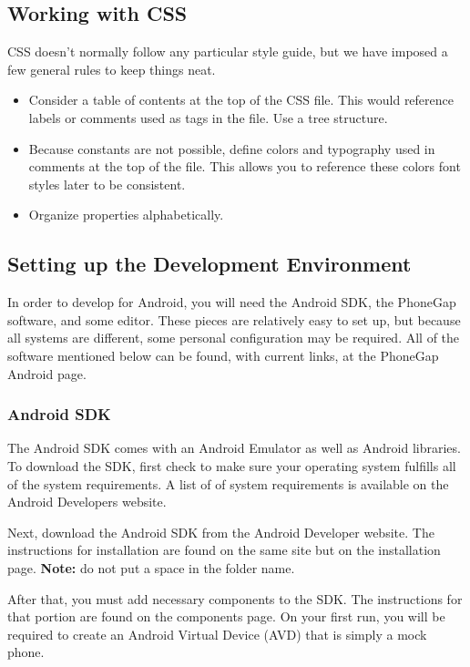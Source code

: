 \documentclass[12pt]{article}
\newenvironment{itemize*}%
  {\begin{itemize}%
  	\setlength{\parsep}{0pt}
    \setlength{\itemsep}{0pt}%
    \setlength{\parskip}{0pt}}%
  {\end{itemize}}
\begin{document}
\begin{itemize*}
\subsection{Working with CSS}
CSS doesn't normally follow any particular style guide, but we have imposed a few general rules to keep things neat\cite{CSSStyle-SmashingMagazine}.

\begin{itemize}
\item Consider a table of contents at the top of the CSS file.  This would reference labels or comments used as tags in the file.  Use a tree structure.
\item Because constants are not possible, define colors and typography used in comments at the top of the file.  This allows you to reference these colors font styles later to be consistent.  
\item Organize properties alphabetically.
\end{itemize}

\subsection{Setting up the Development Environment}
In order to develop for Android, you will need the Android SDK, the PhoneGap software, and some editor.  These pieces are relatively easy to set up, but because all systems are different, some personal configuration may be required.  All of the software mentioned below can be found, with current links, at the PhoneGap Android page\cite{PhoneGap-Android}.  

\subsubsection{Android SDK}
The Android SDK comes with an Android Emulator as well as Android libraries.
To download the SDK, first check to make sure your operating system fulfills all of the system requirements.  A list of of system requirements is available on the Android Developers website\cite{AndroidSDK-SystemRequirements}.

Next, download the Android SDK from the Android Developer website\cite{AndroidSDK-Download}.
The instructions for installation are found on the same site but on the installation page\cite{AndroidSDK-Installation}. \textbf{Note:} do not put a space in the folder name.

After that, you must add necessary components to the SDK.  The instructions for that portion are found on the components page\cite{AndroidSDK-Components}.  On your first run, you will be required to create an Android Virtual Device (AVD) that is simply a mock phone.



\end{itemize*}
\end{document}
